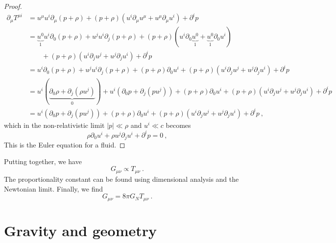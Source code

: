 \begin{proof}
\begin{equation*}
\begin{aligned}
            \partial_\mu T^{\mu i} & = u^\mu u^i \partial_\mu (p + \rho) + (p + \rho) (u^i \partial_\mu u^\mu + u^\mu \partial_\mu u^i) + \partial^i p \\ & = \underbrace{u^0}_1 u^i \partial_0 (p + \rho) + u^j u^i \partial_j (p + \rho) + (p + \rho) (u^i \partial_0 \underbrace{u^0}_1 + \underbrace{u^0}_1 \partial_0 u^i) \\ & \qquad + (p + \rho) (u^i \partial_j u^j + u^j \partial_j u^i) + \partial^i p \\ & = u^i \partial_0 (p + \rho) + u^j u^i \partial_j (p + \rho) + (p + \rho) \partial_0 u^i + (p + \rho) (u^i \partial_j u^j + u^j \partial_j u^i) + \partial^i p \\ & = u^i (\underbrace{\partial_0 \rho + \partial_j(\rho u^j)}_0 ) +  u^i (\partial_0 p + \partial_j(p u^j) ) + (p + \rho) \partial_0 u^i + (p+\rho)(u^i \partial_j u^j + u^j \partial_j u^i ) + \partial^i p \\ & = u^i (\partial_0 p + \partial_j(p u^j) ) + (p + \rho) \partial_0 u^i + (p+\rho)(u^i \partial_j u^j + u^j \partial_j u^i ) + \partial^i p ~,
        \end{aligned}
        \end{equation*}
        which in the non-relativistic limit $|p| \ll \rho$ and $u^i \ll c$ becomes 
        \begin{equation*}
            \rho \partial_0 u^i + \rho u^j \partial_j u^i + \partial^i p = 0 ~,
        \end{equation*}
        This is the Euler equation for a fluid.
    \end{proof}

    Putting together, we have 
    \begin{equation*}
        G_{\mu \nu} \propto T_{\mu\nu} ~.
    \end{equation*}
    The proportionality constant can be found using dimensional analysis and the Newtonian limit. Finally, we find
    \begin{equation*}
        G_{\mu\nu} = 8 \pi G_N T_{\mu\nu} ~.
    \end{equation*}

\section{Gravity and geometry}


